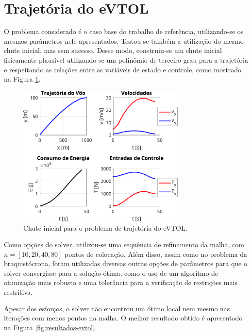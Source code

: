 \section{Trajetória do eVTOL}
\label{sec:resultados-evtol}

O problema considerado é o caso base do trabalho de referência, utilizando-se os mesmos parâmetros nele apresentados. Testou-se também a utilização do mesmo chute inicial, mas sem sucesso. Desse modo, construiu-se um chute inicial fisicamente plausível utilizando-se um polinômio de terceiro grau para a trajetória e respeitando as relações entre as variáveis de estado e controle, como mostrado na Figura \ref{fig:resultados-evtol-chute}.

\begin{figure}[H]
    \centering
    \includegraphics[width=0.75\textwidth]{Cap4/figuras/evtol-chute.pdf}
    \caption{Chute inicial para o problema de trajetória do eVTOL.}
    \label{fig:resultados-evtol-chute}
\end{figure}

Como opções do solver, utilizou-se uma sequência de refinamento da malha, com $n=[10, 20, 40, 80]$ pontos de colocação. Além disso, assim como no problema da braquistócrona, foram utilizadas diversas outras opções de parâmetros para que o solver convergisse para a solução ótima, como o uso de um algoritmo de otimização mais robusto e uma tolerância para a verificação de restrições mais restritiva.

Apesar dos esforços, o solver não encontrou um ótimo local nem mesmo nas iterações com menos pontos na malha. O melhor resultado obtido é apresentado na Figura \ref{fig:resultados-evtol}.

